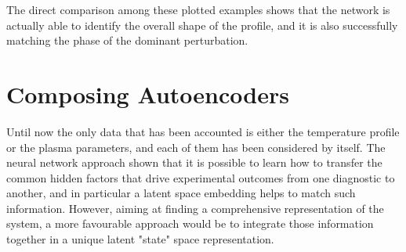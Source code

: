 The direct comparison among these plotted examples shows that the network is actually able to identify the overall shape of the profile, and it is also successfully matching the phase of the dominant perturbation. 


\section{Composing Autoencoders}

Until now the only data that has been accounted is either the temperature profile or the plasma parameters, and each of them has been considered by itself. The neural network approach shown that it is possible to learn how to transfer the common hidden factors that drive experimental outcomes from one diagnostic to another, and in particular a latent space embedding helps to match such information.
However, aiming at finding a comprehensive representation of the system, a more favourable approach would be to integrate those information together in a unique latent "state" space representation.

